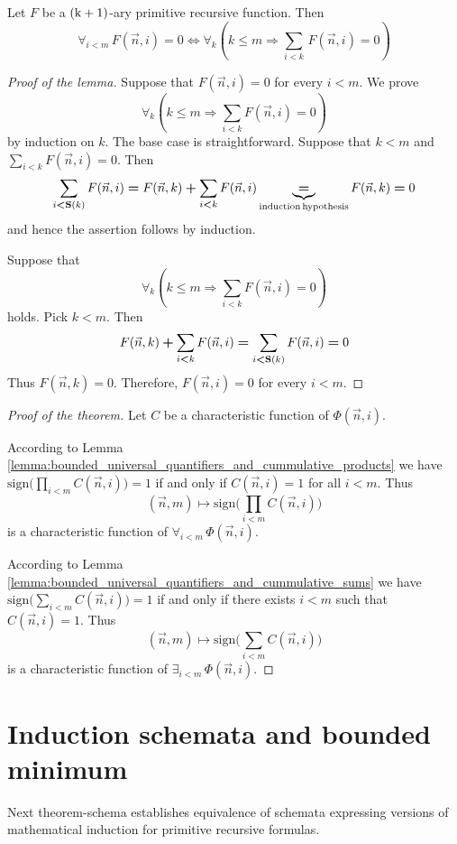 \documentclass[10pt]{amsart}
\newcommand{\mforall}{\boldsymbol{\forall}}
\newcommand{\mexists}{\boldsymbol{\exists}}
\newcommand{\mra}{\boldsymbol{\Rightarrow}}
\newcommand{\mequiv}{\boldsymbol{\Leftrightarrow}}
\newcommand{\mle}{\boldsymbol{<}}
\newcommand{\mleq}{\boldsymbol{\leq}}
\newcommand{\meq}{\boldsymbol{=}}
\newcommand{\mplus}{\boldsymbol{+}}
\begin{document}
\begin{lemma}\label{lemma:bounded_universal_quantifiers_and_cummulative_sums}
	Let $F$ be a $\rm{(k + 1)}$-ary primitive recursive function. Then
	$$\mforall_{i \mle m}\,F(\vec{n},i) \meq 0 \mequiv \mforall_k\left(k \mleq m \mra \sum_{i \mle k}\,F(\vec{n},i) \meq 0\right)$$
\end{lemma}
\begin{proof}[Proof of the lemma]
	Suppose that $F(\vec{n},i) \meq 0$ for every $i \mle m$. We prove
	$$\mforall_k\left(k \mleq m \mra \sum_{i \mle k}F(\vec{n},i) \meq 0\right)$$
	by induction on $k$. The base case is straightforward. Suppose that $k \mle m$ and $\sum_{i \mle k}F(\vec{n},i) \meq 0$. Then
	$$\sum_{i \mle \bd{S}(k)}F(\vec{n},i) \meq F(\vec{n},k) \mplus \sum_{i \mle k}F(\vec{n},i) \underbrace{\meq}_{\mathrm{induction\,hypothesis}}F(\vec{n},k) \meq 0$$
	and hence the assertion follows by induction.

	Suppose that
	$$\mforall_k\left(k \mleq m \mra \sum_{i \mle k}F(\vec{n},i) \meq 0\right)$$
	holds. Pick $k \mle m$. Then
	$$F(\vec{n},k) \mplus \sum_{i \mle k} F(\vec{n},i) \meq \sum_{i \mle \bd{S}(k)}F(\vec{n},i) \meq 0$$
	Thus $F(\vec{n},k) \meq 0$. Therefore, $F(\vec{n},i) \meq 0$ for every $i \mle m$.
\end{proof}

\begin{proof}[Proof of the theorem]
	Let $C$ be a characteristic function of $\Phi(\vec{n},i)$.

	According to Lemma \ref{lemma:bounded_universal_quantifiers_and_cummulative_products} we have $\mathrm{sign}\bigg(\prod_{i \mle m}C(\vec{n},i)\bigg) \meq 1$ if and only if $C(\vec{n},i) \meq 1$ for all $i \mle m$. Thus
	$$(\vec{n},m) \mapsto \mathrm{sign}\bigg(\prod_{i \mle m}C(\vec{n},i)\bigg)$$
	is a characteristic function of $\mforall_{i \mle m}\,\Phi(\vec{n},i)$.

	According to Lemma \ref{lemma:bounded_universal_quantifiers_and_cummulative_sums} we have $\mathrm{sign}\bigg(\sum_{i \mle m}C(\vec{n},i)\bigg) \meq 1$ if and only if there exists $i \mle m$ such that $C(\vec{n},i) \meq 1$. Thus
	$$(\vec{n},m) \mapsto \mathrm{sign}\bigg(\sum_{i \mle m}C(\vec{n},i)\bigg)$$
	is a characteristic function of $\mexists_{i \mle m}\,\Phi(\vec{n},i)$.
\end{proof}

\section{Induction schemata and bounded minimum}
\noindent
Next theorem-schema establishes equivalence of schemata expressing versions of mathematical induction for primitive recursive formulas.
\end{document}
